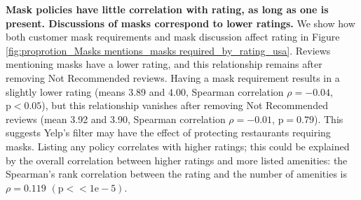 \textbf{Mask policies have little correlation with rating, as long as one is present. Discussions of masks correspond to lower ratings.} We show how both customer mask requirements and mask discussion affect rating in Figure \ref{fig:proprotion_Masks mentions_masks required_by_rating_usa}. Reviews mentioning masks have a lower rating, and this relationship remains after removing Not Recommended reviews. Having a mask requirement results in a slightly lower rating (means 3.89 and 4.00, Spearman correlation $\rho = -0.04$, $\text{p}<0.05$), but this relationship vanishes after removing Not Recommended reviews (mean 3.92 and 3.90, Spearman correlation $\rho = -0.01$, $\text{p}=0.79$). This suggests Yelp's filter may have the effect of protecting restaurants requiring masks. Listing any policy correlates with higher ratings; this could be explained by the overall correlation between higher ratings and more listed amenities: the Spearman's rank correlation between the rating and the number of amenities is $\rho=0.119$ $(\text{p}<<1\text{e}-5)$.   %




